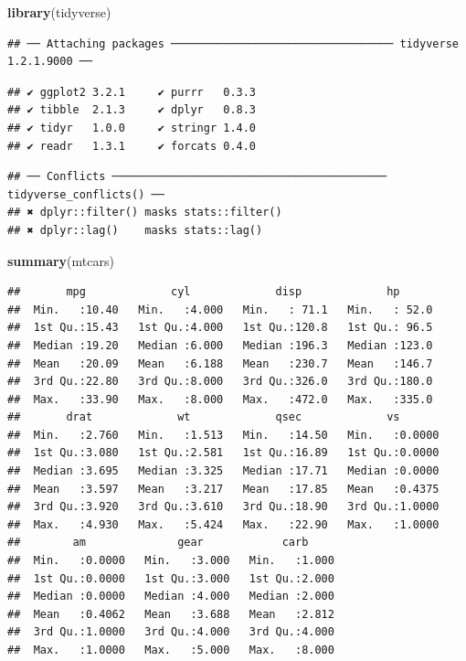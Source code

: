 \documentclass[12pt,article,oneside]{memoir}
\newenvironment{Shaded}{}{}
\newcommand{\KeywordTok}[1]{\textcolor[rgb]{0.00,0.44,0.13}{\textbf{#1}}}
\newcommand{\NormalTok}[1]{#1}
\begin{document}
\begin{Shaded}
\begin{Highlighting}[]
\KeywordTok{library}\NormalTok{(tidyverse)}
\end{Highlighting}
\end{Shaded}

\begin{verbatim}
## ── Attaching packages ────────────────────────────────── tidyverse 1.2.1.9000 ──
\end{verbatim}

\begin{verbatim}
## ✔ ggplot2 3.2.1     ✔ purrr   0.3.3
## ✔ tibble  2.1.3     ✔ dplyr   0.8.3
## ✔ tidyr   1.0.0     ✔ stringr 1.4.0
## ✔ readr   1.3.1     ✔ forcats 0.4.0
\end{verbatim}

\begin{verbatim}
## ── Conflicts ────────────────────────────────────────── tidyverse_conflicts() ──
## ✖ dplyr::filter() masks stats::filter()
## ✖ dplyr::lag()    masks stats::lag()
\end{verbatim}

\begin{Shaded}
\begin{Highlighting}[]
\KeywordTok{summary}\NormalTok{(mtcars)}
\end{Highlighting}
\end{Shaded}

\begin{verbatim}
##       mpg             cyl             disp             hp       
##  Min.   :10.40   Min.   :4.000   Min.   : 71.1   Min.   : 52.0  
##  1st Qu.:15.43   1st Qu.:4.000   1st Qu.:120.8   1st Qu.: 96.5  
##  Median :19.20   Median :6.000   Median :196.3   Median :123.0  
##  Mean   :20.09   Mean   :6.188   Mean   :230.7   Mean   :146.7  
##  3rd Qu.:22.80   3rd Qu.:8.000   3rd Qu.:326.0   3rd Qu.:180.0  
##  Max.   :33.90   Max.   :8.000   Max.   :472.0   Max.   :335.0  
##       drat             wt             qsec             vs        
##  Min.   :2.760   Min.   :1.513   Min.   :14.50   Min.   :0.0000  
##  1st Qu.:3.080   1st Qu.:2.581   1st Qu.:16.89   1st Qu.:0.0000  
##  Median :3.695   Median :3.325   Median :17.71   Median :0.0000  
##  Mean   :3.597   Mean   :3.217   Mean   :17.85   Mean   :0.4375  
##  3rd Qu.:3.920   3rd Qu.:3.610   3rd Qu.:18.90   3rd Qu.:1.0000  
##  Max.   :4.930   Max.   :5.424   Max.   :22.90   Max.   :1.0000  
##        am              gear            carb      
##  Min.   :0.0000   Min.   :3.000   Min.   :1.000  
##  1st Qu.:0.0000   1st Qu.:3.000   1st Qu.:2.000  
##  Median :0.0000   Median :4.000   Median :2.000  
##  Mean   :0.4062   Mean   :3.688   Mean   :2.812  
##  3rd Qu.:1.0000   3rd Qu.:4.000   3rd Qu.:4.000  
##  Max.   :1.0000   Max.   :5.000   Max.   :8.000
\end{verbatim}
\end{document}
